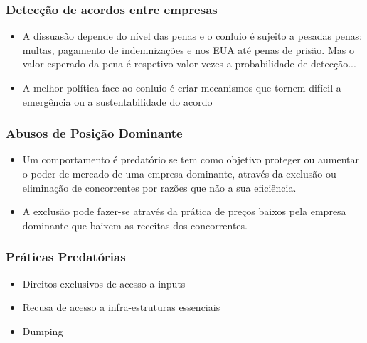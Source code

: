 \begin{frame}
	\frametitle{Detec\c c\~ao de acordos entre empresas}
	\begin{itemize}
		\item A dissuas\~ao depende do n\'ivel das penas e o conluio \'e sujeito a pesadas penas: multas, pagamento de indemniza\c c\~oes e nos EUA at\'e penas de pris\~ao. Mas o valor esperado da pena \'e respetivo valor vezes a probabilidade de detec\c c\~ao...
		\item A melhor pol\'itica face ao conluio \'e criar mecanismos que tornem dif\'icil a emerg\^encia ou a sustentabilidade do acordo
	\end{itemize}
\end{frame}

\begin{frame}
	\frametitle{Abusos de Posi\c c\~ao Dominante}
	\begin{itemize}
		\item Um comportamento \'e predat\'orio se tem como objetivo proteger ou aumentar o poder de mercado de uma empresa dominante, atrav\'es da exclus\~ao ou elimina\c c\~ao de concorrentes por raz\~oes que n\~ao a sua efici\^encia.
		\item A exclus\~ao pode fazer-se atrav\'es da pr\'atica de pre\c cos baixos pela empresa dominante que baixem as receitas dos concorrentes.
	\end{itemize}
\end{frame}

\begin{frame}
	\frametitle{Pr\'aticas Predat\'orias}
	\begin{itemize}
		\item Direitos exclusivos de acesso a inputs
		\item Recusa de acesso a infra-estruturas essenciais
		\item Dumping
	\end{itemize}
\end{frame}

